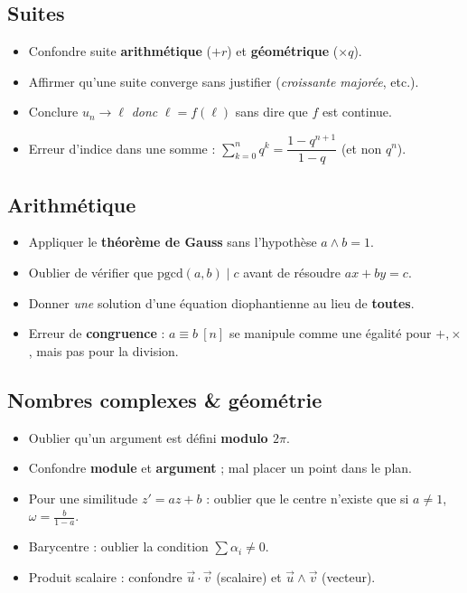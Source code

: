 \subsection{Suites}
\begin{itemize}
\item Confondre suite \textbf{arithmétique} ($+r$) et \textbf{géométrique} ($\times q$).
\item Affirmer qu'une suite converge sans justifier (\emph{croissante majorée}, etc.).
\item Conclure $u_n\to\ell$ \emph{donc} $\ell=f(\ell)$ sans dire que $f$ est continue.
\item Erreur d'indice dans une somme : $\sum_{k=0}^{n}q^k=\dfrac{1-q^{n+1}}{1-q}$ (et non $q^n$).
\end{itemize}

\subsection{Arithmétique}
\begin{itemize}
\item Appliquer le \textbf{théorème de Gauss} sans l'hypothèse $a\wedge b=1$.
\item Oublier de vérifier que $\mathrm{pgcd}(a,b)\mid c$ avant de résoudre $ax+by=c$.
\item Donner \emph{une} solution d'une équation diophantienne au lieu de \textbf{toutes}.
\item Erreur de \textbf{congruence} : $a\equiv b\ [n]$ se manipule comme une égalité pour $+,\times$, mais pas pour la division.
\end{itemize}

\subsection{Nombres complexes \& géométrie}
\begin{itemize}
\item Oublier qu'un argument est défini \textbf{modulo $2\pi$}.
\item Confondre \textbf{module} et \textbf{argument} ; mal placer un point dans le plan.
\item Pour une similitude $z'=az+b$ : oublier que le centre n'existe que si $a\ne1$, $\omega=\frac{b}{1-a}$.
\item Barycentre : oublier la condition $\sum\alpha_i\ne0$.
\item Produit scalaire : confondre $\vec u\cdot\vec v$ (scalaire) et $\vec u\wedge\vec v$ (vecteur).
\end{itemize}

